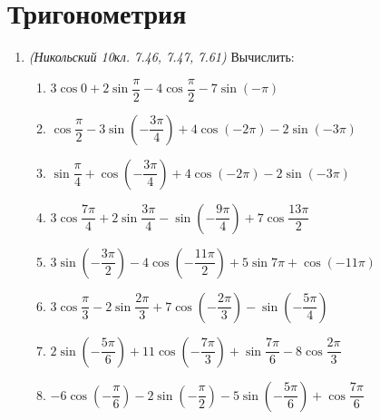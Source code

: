 \documentclass[12pt, a4paper]{article}
\begin{document}
\section{Тригонометрия}
\begin{enumerate}
	\item \textit{(Никольский 10кл. 7.46, 7.47, 7.61)} Вычислить:
	\begin{enumerate}[label=\asbuk*)]
		\item $3\cos0+2\sin\dfrac{\pi}{2}-4\cos\dfrac{\pi}{2}-7\sin(-\pi)$
		\item $\cos\dfrac{\pi}{2}-3\sin\left(-\dfrac{3\pi}{4}\right)+4\cos(-2\pi)-2\sin(-3\pi)$
		\item $\sin\dfrac{\pi}{4}+\cos\left(-\dfrac{3\pi}{4}\right)+4\cos(-2\pi)-2\sin(-3\pi)$
		\item $3\cos\dfrac{7\pi}{4}+2\sin\dfrac{3\pi}{4}-\sin\left(-\dfrac{9\pi}{4}\right)+7\cos\dfrac{13\pi}{2}$
		\item $3\sin\left(-\dfrac{3\pi}{2}\right)-4\cos\left(-\dfrac{11\pi}{2}\right)+5\sin7\pi+\cos(-11\pi)$
		\item $3\cos\dfrac{\pi}{3}-2\sin\dfrac{2\pi}{3}+7\cos\left(-\dfrac{2\pi}{3}\right)-\sin\left(-\dfrac{5\pi}{4}\right)$
		\item $2\sin\left(-\dfrac{5\pi}{6}\right)+11\cos\left(-\dfrac{7\pi}{3}\right)+\sin\dfrac{7\pi}{6}-8\cos\dfrac{2\pi}{3}$
		\item $-6\cos\left(-\dfrac{\pi}{6}\right)-2\sin\left(-\dfrac{\pi}{2}\right)-5\sin\left(-\dfrac{5\pi}{6}\right)+\cos\dfrac{7\pi}{6}$
	\end{enumerate}
\end{enumerate}
\end{document}
